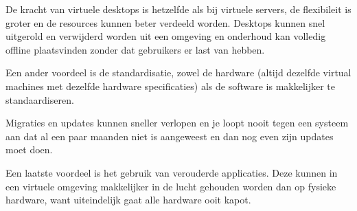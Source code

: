 De kracht van virtuele desktops is hetzelfde als bij virtuele servers, de flexibileit is groter en de resources kunnen beter verdeeld worden. Desktops kunnen snel uitgerold en verwijderd worden uit een omgeving en onderhoud kan volledig offline plaatsvinden zonder dat gebruikers er last van hebben.

Een ander voordeel is de standardisatie, zowel de hardware (altijd dezelfde virtual machines met dezelfde hardware specificaties) als de software is makkelijker te standaardiseren.

Migraties en updates kunnen sneller verlopen en je loopt nooit tegen een systeem aan dat al een paar maanden niet is aangeweest en dan nog even zijn updates moet doen.

Een laatste voordeel is het gebruik van verouderde applicaties. Deze kunnen in een virtuele omgeving makkelijker in de lucht gehouden worden dan op fysieke hardware, want uiteindelijk gaat alle hardware ooit kapot.
